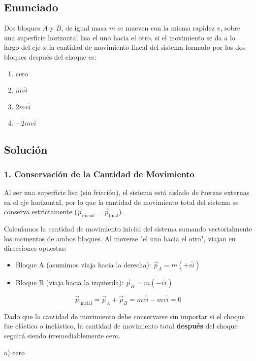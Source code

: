 \documentclass[12pt, a4paper]{article}
\begin{document}
\newpage

\subsection*{Enunciado}
Dos bloques $A$ y $B$, de igual masa $m$ se mueven con la misma rapidez $v$, sobre una superficie horizontal lisa el uno hacia el otro, si el movimiento se da a lo largo del eje $x$ la cantidad de movimiento lineal del sistema formado por los dos bloques después del choque es:
\begin{enumerate}[label=\alph*)]
    \item cero
    \item $mv\hat{i}$
    \item $2mv\hat{i}$
    \item $-2mv\hat{i}$
\end{enumerate}

\subsection*{Solución}

\subsubsection*{1. Conservación de la Cantidad de Movimiento}
Al ser una superficie lisa (sin fricción), el sistema está aislado de fuerzas externas en el eje horizontal, por lo que la cantidad de movimiento total del sistema se conserva estrictamente ($\vec{p}_{\text{inicial}} = \vec{p}_{\text{final}}$).

Calculamos la cantidad de movimiento inicial del sistema sumando vectorialmente los momentos de ambos bloques. Al moverse "el uno hacia el otro", viajan en direcciones opuestas:
\begin{itemize}
    \item Bloque A (asumimos viaja hacia la derecha): $\vec{p}_A = m(+v\hat{i})$
    \item Bloque B (viaja hacia la izquierda): $\vec{p}_B = m(-v\hat{i})$
\end{itemize}
$$ \vec{p}_{\text{inicial}} = \vec{p}_A + \vec{p}_B = mv\hat{i} - mv\hat{i} = 0 $$

Dado que la cantidad de movimiento debe conservarse sin importar si el choque fue elástico o inelástico, la cantidad de movimiento total \textbf{después} del choque seguirá siendo irremediablemente cero.

\begin{tcolorbox}[colback=green!5!white, colframe=green!50!black, title=Respuesta Final]
\centering \Large a) cero
\end{tcolorbox}
\end{document}
